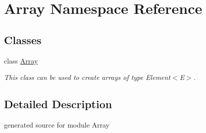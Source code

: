 \hypertarget{namespace_array}{}\section{Array Namespace Reference}
\label{namespace_array}
\subsection*{Classes}
\begin{DoxyCompactItemize}
\item 
class \hyperlink{class_array_1_1_array}{Array}
\begin{DoxyCompactList}\small\item\em This class can be used to create arrays of type Element$<$\+E$>$. \end{DoxyCompactList}\end{DoxyCompactItemize}


\subsection{Detailed Description}
\begin{DoxyVerb}generated source for module Array \end{DoxyVerb}
 